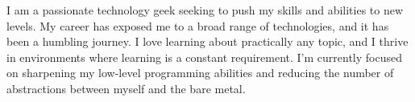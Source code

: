 \documentclass[9pt]{developercv} %
\begin{document}
\begin{minipage}[t]{0.4\textwidth} %
	\vspace{-\baselineskip} %
	
	\noindent
	I am a passionate technology geek seeking to push my skills and abilities to new levels. My 
	career has exposed me to a broad range of technologies, and it has been a humbling journey.
	I love learning about practically any topic, and I thrive in environments where learning is a constant requirement. I'm currently focused
	on sharpening my low-level programming abilities and reducing the number of abstractions between myself and the bare metal.\\ 
\end{minipage}
\hfill %
\begin{minipage}[t]{0.5\textwidth} %
	\vspace{-\baselineskip} %
	\begin{barchart}{5.5}
	\end{barchart}
\end{minipage}

\begin{center}
\end{center}


\end{document}
